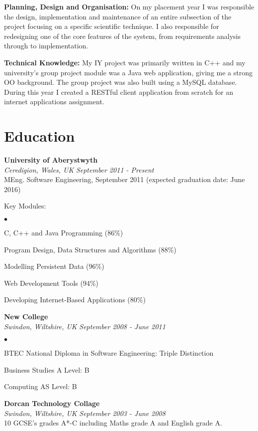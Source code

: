 \documentclass[margin,line]{res}
\newenvironment{list2}{
  \begin{list}{$\bullet$}{%
      \setlength{\itemsep}{0in}
      \setlength{\parsep}{0in} \setlength{\parskip}{0in}
      \setlength{\topsep}{0in} \setlength{\partopsep}{0in}
      \setlength{\leftmargin}{0.2in}}}{\end{list}}
\begin{document}
\begin{resume}
{\bf Planning, Design and Organisation:} On my placement year I was responsible the design, implementation and maintenance of an entire subsection of the project focusing on a specific scientific technique. I also responsible for redesigning one of the core features of the system, from requirements analysis through to implementation.

{\bf Technical Knowledge:} My IY project was primarily written in C++ and my university's group project module was a Java web application, giving me a strong OO background. The group project was also built using a MySQL database. During this year I created a RESTful client application from scratch for an internet applications assignment.

\section{\sc Education}
{\bf University of Aberystwyth}\\
{\it Ceredigion, Wales, UK} \hfill {\it September 2011 - Present}\\
MEng. Software Engineering, September 2011 (expected graduation date: June 2016)

Key Modules:
\begin{list2}

\item C, C++ and Java Programming (86\%)
\item Program Design, Data Structures and Algorithms (88\%)
\item Modelling Persistent Data (96\%)
\item Web Development Tools (94\%)
\item Developing Internet-Based Applications (80\%)
\end{list2}

{\bf New College}\\
{\it Swindon, Wiltshire, UK} \hfill {\it September 2008 - June 2011}
\begin{list2}
\item BTEC National Diploma in Software Engineering: Triple Distinction
\item Business Studies A Level: B
\item Computing AS Level: B
\end{list2}

{\bf Dorcan Technology Collage} \\
{\it Swindon, Wiltshire, UK} \hfill {\it September 2003 - June 2008}\\
10 GCSE's grades A*-C including Maths grade A and English grade A.


\end{resume}
\end{document}
